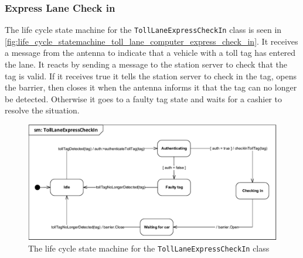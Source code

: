 \subsubsection*{Express Lane Check in}
The life cycle state machine for the \texttt{TollLaneExpressCheckIn} class is seen in \autoref{fig:life_cycle_statemachine_toll_lane_computer_express_check_in}. It receives a message from the antenna to indicate that a vehicle with a toll tag has entered the lane. It reacts by sending a message to the station server to check that the tag is valid. If it receives true it tells the station server to check in the tag, opens the barrier, then closes it when the antenna informs it that the tag can no longer be detected.  Otherwise it goes to a faulty tag state and waits for a cashier to resolve the situation. 
\begin{figure}[H]
\centering
\includegraphics[width=0.7\linewidth]{img/behaviour_state_machines/life_cycle_state_machines/life_cycle_statemachine_toll_lane_computer_express_check_in}
\caption{The life cycle state machine for the \texttt{TollLaneExpressCheckIn} class}
\label{fig:life_cycle_statemachine_toll_lane_computer_express_check_in}
\end{figure}


